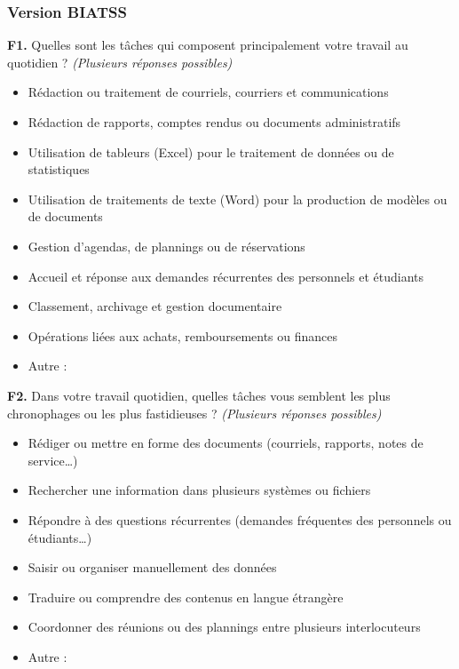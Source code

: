 \subsubsection{Version BIATSS}

\textbf{F1.} Quelles sont les tâches qui composent principalement votre
travail au quotidien ? \textit{(Plusieurs réponses possibles)}
\begin{itemize}[label=$\square$, leftmargin=1.5cm]
  \item Rédaction ou traitement de courriels, courriers et communications
  \item Rédaction de rapports, comptes rendus ou documents administratifs
  \item Utilisation de tableurs (Excel) pour le traitement de données ou
        de statistiques
  \item Utilisation de traitements de texte (Word) pour la production de
        modèles ou de documents
  \item Gestion d'agendas, de plannings ou de réservations
  \item Accueil et réponse aux demandes récurrentes des personnels et
        étudiants
  \item Classement, archivage et gestion documentaire
  \item Opérations liées aux achats, remboursements ou finances
  \item Autre : \underline{\hspace{4cm}}
\end{itemize}

\textbf{F2.} Dans votre travail quotidien, quelles tâches vous semblent
les plus chronophages ou les plus fastidieuses ?
\textit{(Plusieurs réponses possibles)}
\begin{itemize}[label=$\square$, leftmargin=1.5cm]
  \item Rédiger ou mettre en forme des documents (courriels, rapports,
        notes de service\ldots)
  \item Rechercher une information dans plusieurs systèmes ou fichiers
  \item Répondre à des questions récurrentes (demandes fréquentes des
        personnels ou étudiants\ldots)
  \item Saisir ou organiser manuellement des données
  \item Traduire ou comprendre des contenus en langue étrangère
  \item Coordonner des réunions ou des plannings entre plusieurs
        interlocuteurs
  \item Autre : \underline{\hspace{4cm}}
\end{itemize}
 
